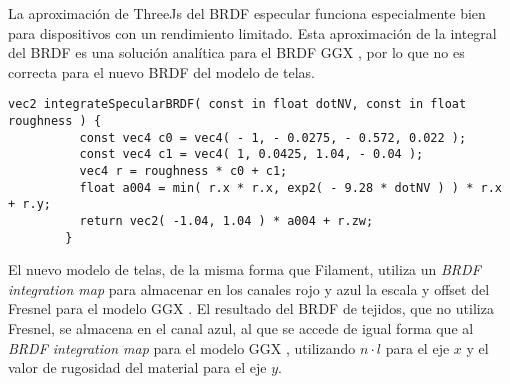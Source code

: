       
      La aproximaci\'on de ThreeJs del BRDF especular funciona especialmente bien para dispositivos con un rendimiento
      limitado. Esta aproximaci\'on de la integral del BRDF es una soluci\'on anal\'itica para el BRDF GGX \autocite{ggx},
      por lo que no es correcta para el nuevo BRDF del modelo de telas.\\

      \begin{lstlisting}[caption=Apromixaci\'on anal\'itica a la integral del BRDF en ThreeJs]
        vec2 integrateSpecularBRDF( const in float dotNV, const in float roughness ) {
          const vec4 c0 = vec4( - 1, - 0.0275, - 0.572, 0.022 );
          const vec4 c1 = vec4( 1, 0.0425, 1.04, - 0.04 );
          vec4 r = roughness * c0 + c1;
          float a004 = min( r.x * r.x, exp2( - 9.28 * dotNV ) ) * r.x + r.y;
          return vec2( -1.04, 1.04 ) * a004 + r.zw;
        }
      \end{lstlisting}
      \singlespacing
      

      El nuevo modelo de telas, de la misma forma que Filament, utiliza un \textit{BRDF integration map} para almacenar
      en los canales rojo y azul la escala y offset del Fresnel para el modelo GGX \autocite{ggx}. El resultado del BRDF de tejidos,
      que no utiliza Fresnel, se almacena en el canal azul, al que se accede de igual forma que al \textit{BRDF integration map} para el modelo GGX \autocite{ggx},
      utilizando $n\cdot{l}$ para el eje $x$ y el valor de rugosidad del material para el eje $y$.




